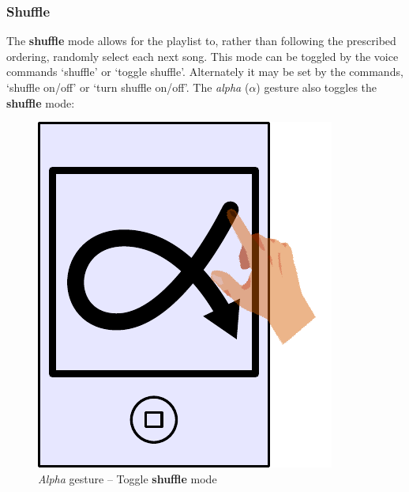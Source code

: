\documentclass[12pt,letterpaper]{article}
\begin{document}
\subsubsection*{Shuffle}
The \textbf{shuffle} mode allows for the playlist to, rather than following the prescribed ordering, randomly select each next song. This mode can be toggled by the voice commands `shuffle' or `toggle shuffle'. Alternately it may be set by the commands, `shuffle on/off' or `turn shuffle on/off'. The \emph{alpha} ($\alpha$) gesture also toggles the \textbf{shuffle} mode:
\begin{figure}[H]
	\centering
	\includegraphics[scale=0.6]{alpha}
	\caption{\emph{Alpha} gesture -- Toggle \textbf{shuffle} mode}
\end{figure}
\end{document}
